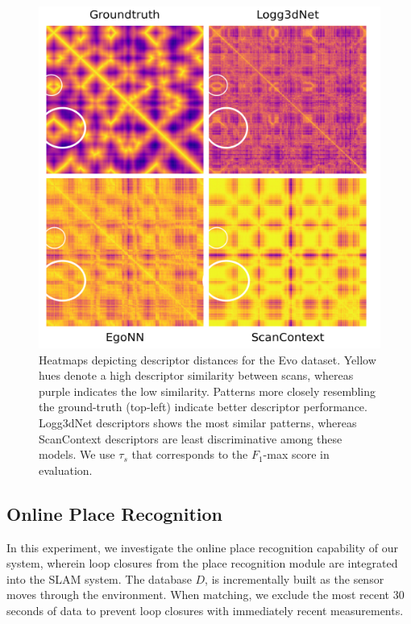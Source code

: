 \begin{figure}[t]
  \centering
  \includegraphics[width=0.99\linewidth]{pics/exp_1.2_heatmap_evo12_plasma_edit}
  \caption{Heatmaps depicting descriptor distances for the Evo dataset. Yellow hues denote a high descriptor similarity between scans, whereas purple indicates the low similarity. Patterns more closely resembling the ground-truth (top-left) indicate better descriptor performance. Logg3dNet descriptors shows the most similar patterns, whereas ScanContext descriptors are least discriminative among these models. We use $\tau_{s}$ that corresponds to the $F_1$-max score in evaluation.}
  \label{fig:heatmap_evo12}
\end{figure}



\subsection{Online Place Recognition}
In this experiment, we investigate the online place recognition capability of our system, wherein loop closures from the place recognition module are integrated into the SLAM system. The database $D$, is incrementally built as the sensor moves through the environment. When matching, we exclude the most recent 30 seconds of data to prevent loop closures with immediately recent measurements.

